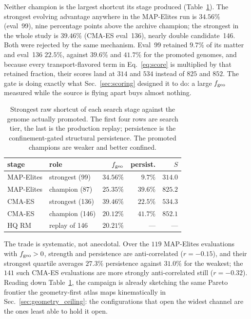 \documentclass[twocolumn,floatfix,aps,prd,nofootinbib]{revtex4-2}
\begin{document}
Neither champion is the largest shortcut its stage produced
(Table~\ref{tab:strength_persistence}). The strongest evolving advantage
anywhere in the MAP-Elites run is $34.56\%$ (eval~99), nine percentage points
above the archive champion; the strongest in the whole study is $39.46\%$
(CMA-ES eval~136), nearly double candidate~146. Both were rejected by the same
mechanism. Eval~99 retained $9.7\%$ of its matter and eval~136 $22.5\%$, against
$39.6\%$ and $41.7\%$ for the promoted genomes, and because every
transport-flavored term in Eq.~\eqref{eq:score} is multiplied by that retained
fraction, their scores land at $314$ and $534$ instead of $825$ and $852$. The
gate is doing exactly what Sec.~\ref{sec:scoring} designed it to do: a large
$f_{\rm geo}$ measured while the source is flying apart buys almost nothing.

\begin{table}[tbp]
\caption{Strongest raw shortcut of each search stage against the genome
actually promoted. The first four rows are search tier, the last is the
production replay; persistence is the confinement-gated structural
persistence. The promoted champions are weaker and better confined.}
\label{tab:strength_persistence}
\begin{ruledtabular}
\begin{tabular}{llrrr}
stage & role & $f_{\rm geo}$ & persist. & $S$ \\
\hline
MAP-Elites & strongest (99)     & $34.56\%$ & $9.7\%$  & $314.0$ \\
MAP-Elites & champion (87)      & $25.35\%$ & $39.6\%$ & $825.2$ \\
CMA-ES     & strongest (136)    & $39.46\%$ & $22.5\%$ & $534.3$ \\
CMA-ES     & champion (146)     & $20.12\%$ & $41.7\%$ & $852.1$ \\
HQ RM      & replay of 146      & $20.21\%$ & ---      & --- \\
\end{tabular}
\end{ruledtabular}
\end{table}

The trade is systematic, not anecdotal. Over the $119$ MAP-Elites evaluations
with $f_{\rm geo}>0$, strength and persistence are anti-correlated
($r=-0.15$), and their strongest quartile averages $27.3\%$ persistence against
$31.0\%$ for the weakest; the $141$ such CMA-ES evaluations are more strongly
anti-correlated still ($r=-0.32$). Reading down
Table~\ref{tab:strength_persistence}, the campaign is
already sketching the same Pareto frontier the geometry-first atlas maps
kinematically in Sec.~\ref{sec:geometry_ceiling}: the configurations that open
the widest channel are the ones least able to hold it open.
\end{document}
